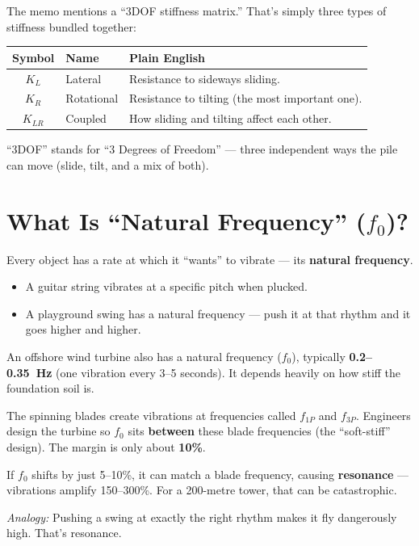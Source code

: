 \documentclass[11pt,a4paper]{article}
\begin{document}
The memo mentions a ``3DOF stiffness matrix.''  That's simply three types of
stiffness bundled together:

\begin{center}
\begin{tabular}{clp{6.5cm}}
\toprule
\textbf{Symbol} & \textbf{Name} & \textbf{Plain English} \\
\midrule
$K_L$     & Lateral     & Resistance to sideways sliding. \\
$K_R$     & Rotational  & Resistance to tilting (the most important one). \\
$K_{LR}$  & Coupled     & How sliding and tilting affect each other. \\
\bottomrule
\end{tabular}
\end{center}

``3DOF'' stands for ``3 Degrees of Freedom'' --- three independent ways the pile
can move (slide, tilt, and a mix of both).

\section{What Is ``Natural Frequency'' ($f_0$)?}
\label{sec:f0}

Every object has a rate at which it ``wants'' to vibrate --- its
\textbf{natural frequency}.

\begin{itemize}[noitemsep]
  \item A guitar string vibrates at a specific pitch when plucked.
  \item A playground swing has a natural frequency --- push it at that rhythm
        and it goes higher and higher.
\end{itemize}

An offshore wind turbine also has a natural frequency ($f_0$), typically
\textbf{0.2--0.35~Hz} (one vibration every 3--5 seconds).  It depends
heavily on how stiff the foundation soil is.

\begin{tcolorbox}[colback=red!5, colframe=red!50!black, title=Why $f_0$ matters: Resonance]
The spinning blades create vibrations at frequencies called $f_{1P}$ and
$f_{3P}$.  Engineers design the turbine so $f_0$ sits \textbf{between} these
blade frequencies (the ``soft-stiff'' design).  The margin is only about
\textbf{10\%}.

If $f_0$ shifts by just 5--10\%, it can match a blade frequency, causing
\textbf{resonance} --- vibrations amplify 150--300\%.  For a 200-metre tower,
that can be catastrophic.

\medskip
\textit{Analogy:} Pushing a swing at exactly the right rhythm makes it fly
dangerously high.  That's resonance.
\end{tcolorbox}
\end{document}
